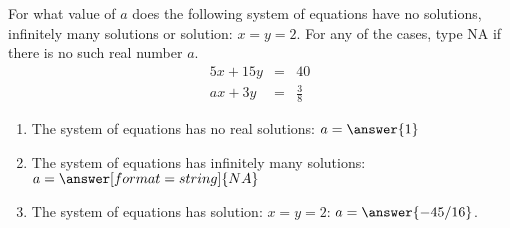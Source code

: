\documentclass{ximera}
\author{Parisa Fatheddin}
\begin{document}
\begin{exercise}  For what value of $a$ does the following system of equations have no solutions, infinitely many solutions or solution: $x=y=2$. For any of the cases, type NA if there is no such real number $a$.
\begin{eqnarray*}
5x+15y &=& 40\\ ax +3y &=& \frac{3}{8}
\end{eqnarray*}
\begin{prompt}
  \begin{enumerate}
    \item The system of equations has no real solutions: $a= \answer{1}$
    \item The system of equations has infinitely many solutions: $a= \answer[format=string]{NA}$
    \item The system of equations has solution: $x=y=2$: $a=\answer{-45/16}$.
  \end{enumerate}
\end{prompt}
\end{exercise}
\end{document}
